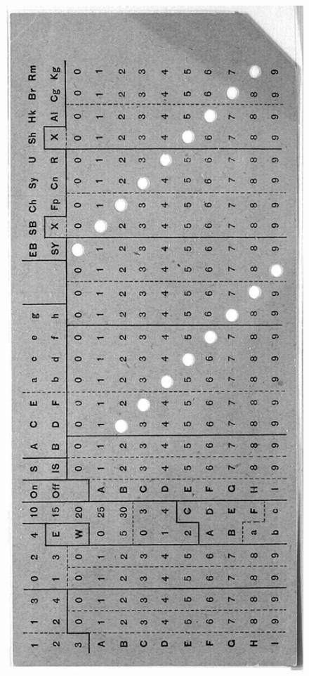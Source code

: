 \documentclass[11pt,a4paper,spanish]{beamer}
\begin{document}
\begin{frame}
\begin{minipage}{0.3\textwidth}
    \begin{figure}
        \includegraphics[width=1.0\textwidth]{img/hcard.jpg}
        \captionsetup{textfont=tiny,labelformat=empty}
        \caption{}
    \end{figure}

\end{minipage}

\end{frame}
\end{document}
